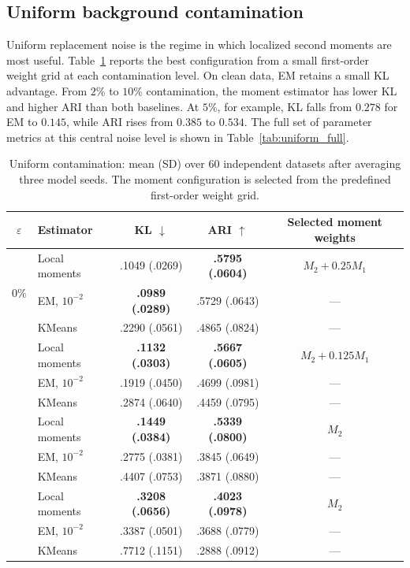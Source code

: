 \documentclass[11pt,a4paper]{article}
\newcommand{\best}[1]{\textbf{#1}}
\newcommand{\Mone}{M_1}
\newcommand{\Mtwo}{M_2}
\begin{document}
\subsection{Uniform background contamination}
\label{sec:uniform}

Uniform replacement noise is the regime in which localized second moments
are most useful.  Table~\ref{tab:uniform_main} reports the best configuration
from a small first-order weight grid at each contamination level.  On clean
data, EM retains a small KL advantage.  From $2\%$ to $10\%$ contamination,
the moment estimator has lower KL and higher ARI than both baselines.  At
$5\%$, for example, KL falls from $0.278$ for EM to $0.145$, while ARI rises
from $0.385$ to $0.534$.  The full set of parameter metrics at this central
noise level is shown in Table~\ref{tab:uniform_full}.

\begin{table}[ht]
\centering
\scriptsize
\caption{Uniform contamination: mean (SD) over 60 independent datasets after
averaging three model seeds.  The moment configuration is selected from the
predefined first-order weight grid.}
\label{tab:uniform_main}
\begin{tabular}{@{}c l c c c@{}}
\toprule
$\varepsilon$ & Estimator & KL $\downarrow$ & ARI $\uparrow$
  & Selected moment weights \\
\midrule
\multirow{3}{*}{$0\%$}
 & Local moments & .1049 (.0269) & \best{.5795 (.0604)} & $\Mtwo+0.25\Mone$ \\
 & EM, $10^{-2}$ & \best{.0989 (.0289)} & .5729 (.0643) & --- \\
 & KMeans & .2290 (.0561) & .4865 (.0824) & --- \\
\addlinespace
\multirow{3}{*}{$2\%$}
 & Local moments & \best{.1132 (.0303)} & \best{.5667 (.0605)} & $\Mtwo+0.125\Mone$ \\
 & EM, $10^{-2}$ & .1919 (.0450) & .4699 (.0981) & --- \\
 & KMeans & .2874 (.0640) & .4459 (.0795) & --- \\
\addlinespace
\multirow{3}{*}{$5\%$}
 & Local moments & \best{.1449 (.0384)} & \best{.5339 (.0800)} & $\Mtwo$ \\
 & EM, $10^{-2}$ & .2775 (.0381) & .3845 (.0649) & --- \\
 & KMeans & .4407 (.0753) & .3871 (.0880) & --- \\
\addlinespace
\multirow{3}{*}{$10\%$}
 & Local moments & \best{.3208 (.0656)} & \best{.4023 (.0978)} & $\Mtwo$ \\
 & EM, $10^{-2}$ & .3387 (.0501) & .3688 (.0779) & --- \\
 & KMeans & .7712 (.1151) & .2888 (.0912) & --- \\
\bottomrule
\end{tabular}
\end{table}
\end{document}
